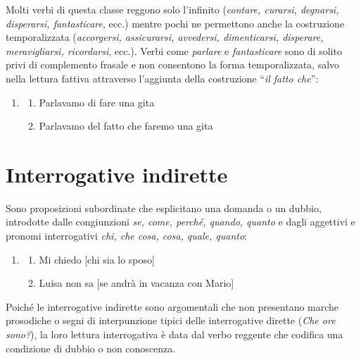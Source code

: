 \documentclass[
  a4paper,
  twoside,
  11pt,
  chapterprefix=false,
  bibliography=totocnumbered,
  listof=flat]{scrbook}
\providecommand{\tightlist}{%
  \setlength{\itemsep}{0pt}\setlength{\parskip}{0pt}}
\begin{document}
Molti verbi di questa classe reggono solo l'infinito (\emph{contare, curarsi, degnarsi, disperarsi, fantasticare}, ecc.) mentre pochi ne permettono anche la costruzione temporalizzata (\emph{accorgersi, assicurarsi, avvedersi, dimenticarsi, disperare, meravigliarsi, ricordarsi}, ecc.).
Verbi come \emph{parlare} e \emph{fantasticare} sono di solito privi di complemento frasale e non consentono la forma temporalizzata, salvo nella lettura fattiva attraverso l'aggiunta della costruzione \enquote{\emph{il fatto che}}:

\begin{enumerate}
\def\labelenumi{(\arabic{enumi})}
\setcounter{enumi}{67}
\item
  \begin{enumerate}
  \def\labelenumii{\alph{enumii}.}
  \tightlist
  \item
    Parlavamo di fare una gita
  \item
    Parlavamo del fatto che faremo una gita
  \end{enumerate}
\end{enumerate}

\hypertarget{interrogative-indirette}{%
\section{Interrogative indirette}\label{interrogative-indirette}}

Sono proposizioni subordinate che esplicitano una domanda o un dubbio, introdotte dalle congiunzioni \emph{se, come, perché, quando, quanto} e dagli aggettivi e pronomi interrogativi \emph{chi, che cosa, cosa, quale, quanto}:

\begin{enumerate}
\def\labelenumi{(\arabic{enumi})}
\setcounter{enumi}{68}
\item
  \begin{enumerate}
  \def\labelenumii{\alph{enumii}.}
  \tightlist
  \item
    Mi chiedo {[}chi sia lo sposo{]}
  \item
    Luisa non sa {[}se andrà in vacanza con Mario{]}
  \end{enumerate}
\end{enumerate}

Poiché le interrogative indirette sono argomentali che non presentano marche prosodiche o segni di interpunzione tipici delle interrogative dirette (\emph{Che ore sono?}), la loro lettura interrogativa è data dal verbo reggente che codifica una condizione di dubbio o non conoscenza.
\end{document}
